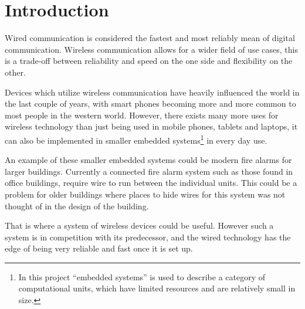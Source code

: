 \chapter{Introduction}
\vspace{-20pt}
Wired communication is considered the fastest and  most reliably mean of digital communication.
Wireless communication allows for a wider field of use cases, this is a trade-off between reliability and speed on the one side and flexibility on the other. \cite{wirelessTradeoffs}

Devices which utilize wireless communication have heavily influenced the world in the last couple of years, with smart phones becoming more and more common to most people in the western world. \cite{2013-SmartPhoneUse}
However, there exists many more uses for wireless technology than just being used in mobile phones, tablets and laptops, it can also be implemented in smaller embedded systems\footnote{In this project \enquote{embedded systems} is used to describe a category of computational units, which have limited resources and are relatively small in size. } in every day use.



An example of these smaller embedded systems could be modern fire alarms for larger buildings.
Currently a connected fire alarm system such as those found in office buildings, require wire to run between the individual units.
This could be a problem for older buildings where places to hide wires for this system was not thought of in the design of the building.

That is where a system of wireless devices could be useful. 
However such a system is in competition with its predecessor, and the wired technology has the edge of being very reliable and fast once it is set up. 

